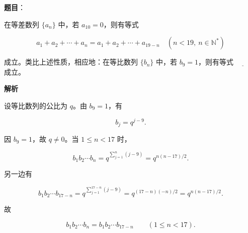 \begin{answer}

\textbf{题目}：

在等差数列 $\{a_n\}$ 中，若 $a_{10}=0$，则有等式

\nopagebreak[4]
\[
a_1+a_2+\cdots+a_n=a_1+a_2+\cdots+a_{19-n}\quad(n<19,\ n\in\mathbb{N}^{*})
\]

成立。类比上述性质，相应地：在等比数列 $\{b_n\}$ 中，若 $b_9=1$，则有等式 $\underline{\qquad}$ 成立。

\textbf{解析}

设等比数列的公比为 $q$。由 $b_9=1$，有

\nopagebreak[4]
\[
b_j=q^{j-9}.
\]

因 $b_9=1$，故 $q\ne0$。当 $1\le n<17$ 时，

\nopagebreak[4]
\[
b_1b_2\cdots b_n
=q^{\sum_{j=1}^{n}(j-9)}
=q^{n(n-17)/2}.
\]

另一边有

\nopagebreak[4]
\[
b_1b_2\cdots b_{17-n}
=q^{\sum_{j=1}^{17-n}(j-9)}
=q^{(17-n)(-n)/2}
=q^{n(n-17)/2}.
\]

故

\nopagebreak[4]
\[
b_1b_2\cdots b_n=b_1b_2\cdots b_{17-n}\qquad(1\le n<17).
\]


\end{answer}


